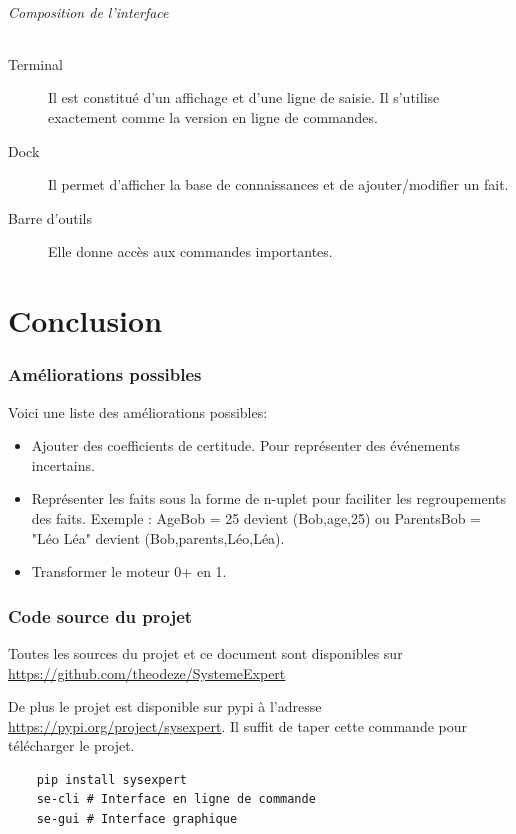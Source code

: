 \documentclass[a4paper, 11pt]{article}
\begin{document}
\paragraph{Composition de l'interface}

\begin{description}
    \item[Terminal] Il est constitué d'un affichage et d'une ligne de saisie. Il s'utilise exactement comme la version en ligne de commandes.
    \item[Dock] Il permet d'afficher la base de connaissances et de ajouter/modifier un fait.
    \item[Barre d'outils] Elle donne accès aux commandes importantes.
\end{description}

\part{Conclusion}

\section{Améliorations possibles}

Voici une liste des améliorations possibles:

\begin{itemize}
    \item Ajouter des coefficients de certitude. Pour représenter des événements incertains.
    \item Représenter les faits sous la forme de n-uplet pour faciliter les regroupements des faits. Exemple : AgeBob = 25 devient (Bob,age,25) ou ParentsBob = "Léo Léa" devient (Bob,parents,Léo,Léa).
    \item Transformer le moteur 0+ en 1.
\end{itemize}

\section{Code source du projet}

Toutes les sources du projet et ce document sont disponibles sur \url{https://github.com/theodeze/SystemeExpert}

De plus le projet est disponible sur pypi à l'adresse \url{https://pypi.org/project/sysexpert}. Il suffit de taper cette commande pour télécharger le projet.

\begin{verbatim}
    pip install sysexpert
    se-cli # Interface en ligne de commande
    se-gui # Interface graphique
\end{verbatim}
\end{document}
